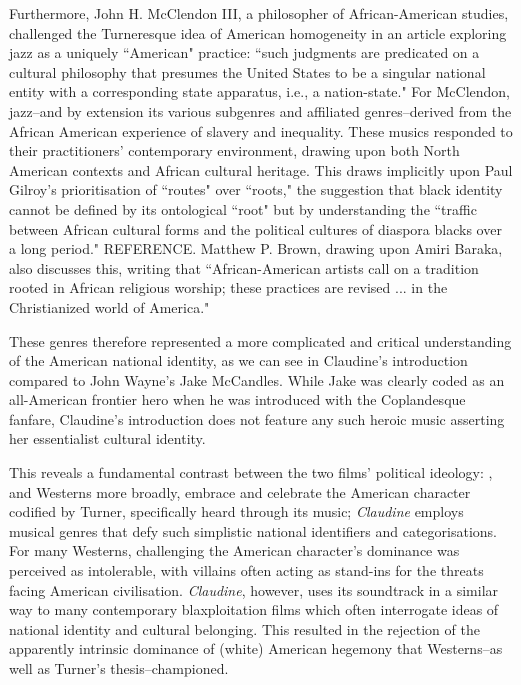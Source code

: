 Furthermore, John H. McClendon III, a philosopher of African-American studies, challenged the Turneresque idea of American homogeneity in an article exploring jazz as a uniquely ``American" practice:
``such judgments are predicated on a cultural philosophy that presumes the United States to be a singular national entity with a corresponding state apparatus, i.e., a nation-state."\autocite[][22]{mcclendon_iii_jazz_2004}
For McClendon, jazz–and by extension its various subgenres and affiliated genres–derived from the African American experience of slavery and inequality.
These musics responded to their practitioners' contemporary environment, drawing upon both North American contexts and African cultural heritage.
This draws implicitly upon Paul Gilroy's prioritisation of ``routes" over ``roots," the suggestion that black identity cannot be defined by its ontological ``root" but by understanding the ``traffic between African cultural forms and the political cultures of diaspora blacks over a long period." REFERENCE.
Matthew P. Brown, drawing upon Amiri Baraka, also discusses this, writing that ``African-American artists call on a tradition rooted in African religious worship; these practices are revised ... in the Christianized world of America."\autocite[][489]{brown_funk_1994}

These genres therefore represented a more complicated and critical understanding of the American national identity, as we can see in Claudine's introduction compared to John Wayne's Jake McCandles.
While Jake was clearly coded as an all-American frontier hero when he was introduced with the Coplandesque fanfare, Claudine's introduction does not feature any such heroic music asserting her essentialist cultural identity.

This reveals a fundamental contrast between the two films' political ideology: \textcite{sherman_big_1971}, and Westerns more broadly, embrace and celebrate the American character codified by Turner, specifically heard through its music; \textit{Claudine} employs musical genres that defy such simplistic national identifiers and categorisations.
For many Westerns, challenging the American character's dominance was perceived as intolerable, with villains often acting as stand-ins for the threats facing American civilisation.
\textit{Claudine}, however, uses its soundtrack in a similar way to many contemporary blaxploitation films which often interrogate ideas of national identity and cultural belonging.
This resulted in the rejection of the apparently intrinsic dominance of (white) American hegemony that Westerns–as well as Turner's thesis–championed.



